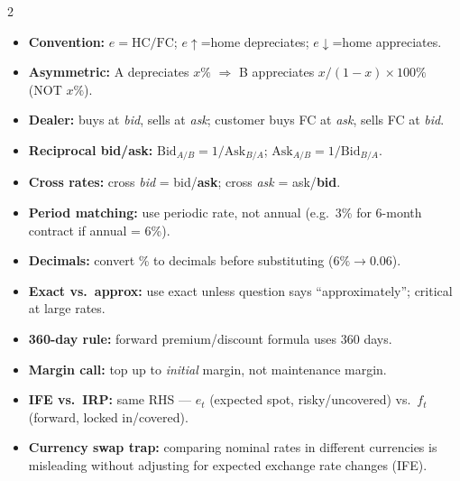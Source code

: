 \documentclass[7.5pt,a4paper]{article}
\newcommand{\kw}[1]{\textbf{#1}}
\begin{document}
\vspace{1pt}

\begin{trapbox}
\begin{multicols}{2}
\fontsize{6.2}{7.8}\selectfont
\begin{itemize}
  \item \kw{Convention:} $e=\text{HC}/\text{FC}$; $e\uparrow$=home depreciates; $e\downarrow$=home appreciates.
  \item \kw{Asymmetric:} A depreciates $x\%$ $\Rightarrow$ B appreciates $x/(1{-}x)\times100\%$ (NOT $x\%$).
  \item \kw{Dealer:} buys at \textit{bid}, sells at \textit{ask}; customer buys FC at \textit{ask}, sells FC at \textit{bid}.
  \item \kw{Reciprocal bid/ask:} $\mathrm{Bid}_{A/B}=1/\mathrm{Ask}_{B/A}$; $\mathrm{Ask}_{A/B}=1/\mathrm{Bid}_{B/A}$.
  \item \kw{Cross rates:} cross \textit{bid} = bid/\textbf{ask}; cross \textit{ask} = ask/\textbf{bid}.
  \item \kw{Period matching:} use periodic rate, not annual (e.g.\ 3\% for 6-month contract if annual = 6\%).
\end{itemize}
\columnbreak
\begin{itemize}
  \item \kw{Decimals:} convert \% to decimals before substituting ($6\%\to0.06$).
  \item \kw{Exact vs.\ approx:} use exact unless question says ``approximately''; critical at large rates.
  \item \kw{360-day rule:} forward premium/discount formula uses 360 days.
  \item \kw{Margin call:} top up to \textit{initial} margin, not maintenance margin.
  \item \kw{IFE vs.\ IRP:} same RHS --- $e_t$ (expected spot, risky/uncovered) vs.\ $f_t$ (forward, locked in/covered).
  \item \kw{Currency swap trap:} comparing nominal rates in different currencies is misleading without adjusting for expected exchange rate changes (IFE).
\end{itemize}
\end{multicols}
\end{trapbox}
\end{document}
